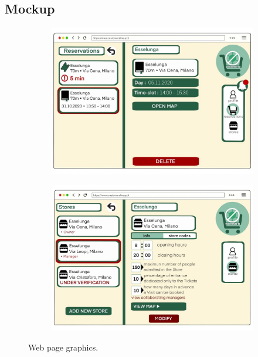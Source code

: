 \documentclass[a4paper, 12pt, oneside, table]{article}
\begin{document}
\subsection{Mockup}
\begin{figure}[h!]
\centering
\begin{subfigure}
	\centering
  	\includegraphics[height=0.4\textheight, scale=0.2, keepaspectratio]{img/customer_interface.jpg} 
 \end{subfigure}
 \begin{subfigure}
	\centering
  	\includegraphics[height=0.4\textheight, scale=0.2, keepaspectratio]{img/manager_interface.jpg}
 \end{subfigure}
	\caption{Web page graphics.}
 	\label{web_graphics}
\end{figure}
\end{document}
